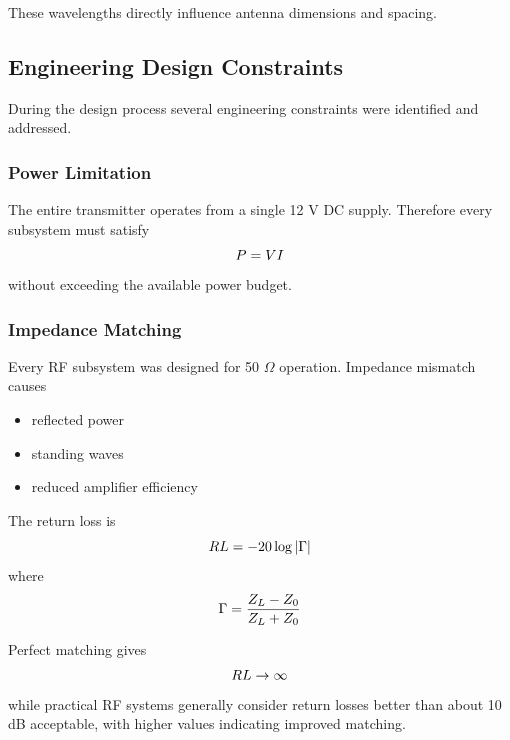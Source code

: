\documentclass[12pt,a4paper]{report}
\begin{document}
	These wavelengths directly influence antenna dimensions and spacing.
	
		
	\subsection{Engineering Design Constraints}
	
	During the design process several engineering constraints were identified and addressed.
	
	\subsubsection{Power Limitation}
	
	The entire transmitter operates from a single 12 V DC supply. Therefore every subsystem must satisfy
	\begingroup
	\setlength{\mathindent}{0pt}
	\begin{equation*}
		\hfill
		P = VI
		\hfill
	\end{equation*}
	\endgroup
	without exceeding the available power budget.
	
	\subsubsection{Impedance Matching}
	
	Every RF subsystem was designed for 50 $\Omega$ operation. Impedance mismatch causes
	\begin{itemize}
		\item reflected power
		\item standing waves
		\item reduced amplifier efficiency
	\end{itemize}
	
	The return loss is
	\begingroup
	\setlength{\mathindent}{0pt}
	\begin{equation*}
		\hfill
		RL = -20\log|\Gamma|
		\hfill
	\end{equation*}
	\endgroup
	where
	\begingroup
	\setlength{\mathindent}{0pt}
	\begin{equation*}
		\hfill
		\Gamma = \frac{Z_L - Z_0}{Z_L + Z_0}
		\hfill
	\end{equation*}
	\endgroup
	
	Perfect matching gives
	\begingroup
	\setlength{\mathindent}{0pt}
	\begin{equation*}
		\hfill
		RL \rightarrow \infty
		\hfill
	\end{equation*}
	\endgroup
	while practical RF systems generally consider return losses better than about 10 dB acceptable, with higher values indicating improved matching.
	
\end{document}
